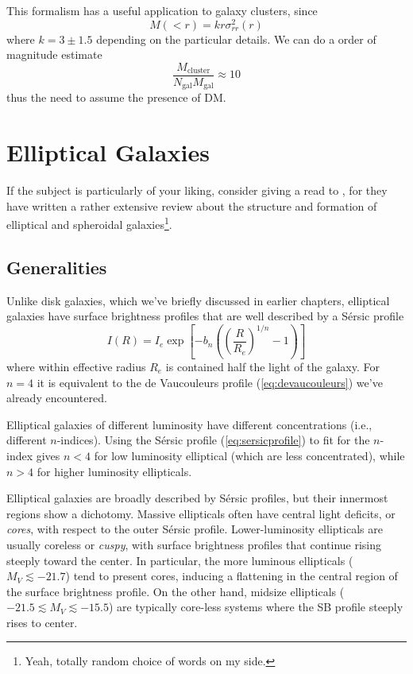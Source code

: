 \par This formalism has a useful application to galaxy clusters, since 
\begin{equation*}
    M(<r) = kr\sigma_{rr}^{2}(r)
\end{equation*}
where $k = 3\pm 1.5$ depending on the particular details. We can do a order of magnitude estimate
\begin{equation*}
    \frac{M_{\text{cluster}}}{N_{\text{gal}}M_{\text{gal}}} \approx 10
\end{equation*}
thus the need to assume the presence of DM.

\section{Elliptical Galaxies}

If the subject is particularly of your liking, consider giving a read to \cite{Kormendy_2009}, for they have written a rather extensive review about the structure and formation of elliptical and spheroidal galaxies\footnote{Yeah, totally random choice of words on my side.}.

\subsection{Generalities}

Unlike disk galaxies, which we've briefly discussed in earlier chapters, elliptical galaxies have surface brightness profiles that are well described by a Sérsic profile
\begin{equation}
    I(R) = I_{e}\exp\left[-b_{n}\left(\left(\frac{R}{R_{e}}\right)^{1/n}-1\right)\right]
    \label{eq:sersicprofile}
\end{equation}
where within effective radius $R_{e}$ is contained half the light of the galaxy. For $n=4$ it is equivalent to the de Vaucouleurs profile (\ref{eq:devaucouleurs}) we've already encountered.
\par Elliptical galaxies of different luminosity have different concentrations (i.e., different $n$-indices). Using the Sérsic profile (\ref{eq:sersicprofile}) to fit for the $n$-index gives $n<4$ for low luminosity elliptical (which are less concentrated), while $n>4$ for higher luminosity ellipticals.
\par Elliptical galaxies are broadly described by Sérsic profiles, but their innermost regions show a dichotomy. Massive ellipticals often have central light deficits, or \emph{cores}, with respect to the outer Sérsic profile. Lower-luminosity ellipticals are usually coreless or \emph{cuspy}, with surface brightness profiles that continue rising steeply toward the center. In particular, the more luminous ellipticals ($M_{V}\lesssim -21.7$) tend to present cores, inducing a flattening in the central region of the surface brightness profile. On the other hand, midsize ellipticals ($-21.5\lesssim M_{V}\lesssim -15.5$) are typically core-less systems where the SB profile steeply rises to center.

